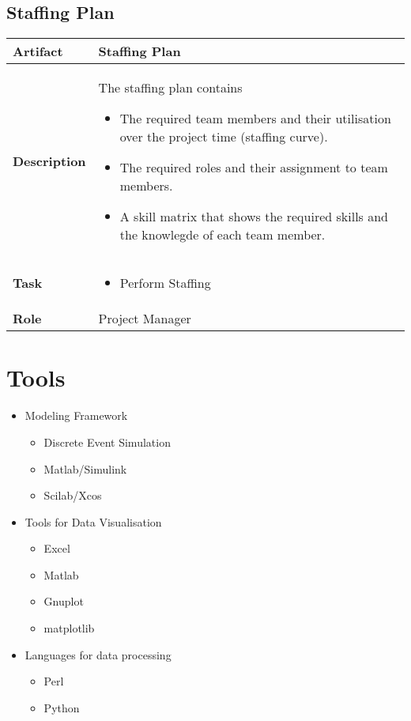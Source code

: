 \subsection{Staffing Plan}
\begin{minipage}{\textwidth}
 \label{table:ch6_Artifact_Staffing_Plan}
\begin{tabular}
	{|m{2cm}|m{10cm}|} \hline \bfseries Artifact & Staffing Plan\\
	\hline \bfseries Description & The staffing plan contains
	\begin{itemize}
		\item The required team members and their utilisation over the project time (staffing curve).
		\item The required roles and their assignment to team members.
		\item A skill matrix that shows the required skills and the knowlegde of each team member.
	\end{itemize}
	\\
	\hline \bfseries Task & 
	\begin{itemize}
		\item Perform Staffing
	\end{itemize}
	\\
	\hline \bfseries Role & Project Manager\\
	\hline 
\end{tabular}
\end{minipage}

\section{Tools} %
\label{sec:ch6_tools}

\begin{itemize}
	\item Modeling Framework
	\begin{itemize}
		\item Discrete Event Simulation
		\item Matlab/Simulink
		\item Scilab/Xcos
	\end{itemize}
	\item Tools for Data Visualisation
	\begin{itemize}
		\item Excel
		\item Matlab
		\item Gnuplot
		\item matplotlib
	\end{itemize}
	\item Languages for data processing
	\begin{itemize}
		\item Perl
		\item Python
	\end{itemize}
\end{itemize}

